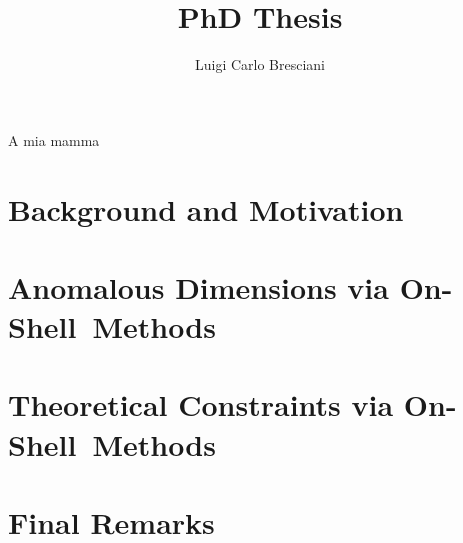 \documentclass[a4paper, 11pt, oneside, final]{book}
\title{PhD Thesis}
\author{Luigi Carlo Bresciani}
\begin{document}
\allsectionsfont{\fontsections}
\pagestyle{myplain}
\flushbottom

\frontmatter


\begin{dedication}
A mia mamma
\setcounter{page}{2}
\end{dedication}


%


\tableofcontents


%

\mainmatter

\part{Background and Motivation}





\part{Anomalous Dimensions via On-Shell~Methods}









\part{Theoretical Constraints via On-Shell~Methods}










\part{Final Remarks}




% 

% 

% 




\end{document}
